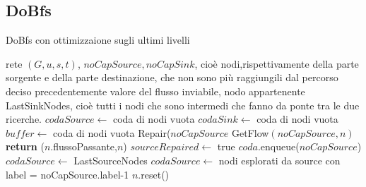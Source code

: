 \documentclass{article}
\begin{document}
\subsection{DoBfs}
\begin{algorithm}
    \caption{DoBfs con ottimizzaione sugli ultimi livelli}
    \begin{algorithmic}[1]
        \REQUIRE rete $(G,u,s,t)$, $noCapSource, noCapSink$, cioè nodi,rispettivamente della parte sorgente e della parte destinazione, che non sono più raggiungili dal percorso deciso precedentemente
        \ENSURE valore del flusso inviabile, nodo appartenente LastSinkNodes, cioè tutti i nodi che sono intermedi che fanno da ponte tra le due ricerche.
        \STATE $codaSource \leftarrow$ coda di nodi vuota
        \STATE $codaSink \leftarrow$ coda di nodi vuota
        \STATE $buffer \leftarrow$ coda di nodi vuota
        \STATE Repair($noCapSource$
        \STATE GetFlow$(noCapSource,n)$ 
        \STATE \textbf{return} ($n$.flussoPassante,$n$)
        \ENDIF
        \ENDFOR
        \ELSE
        \STATE $sourceRepaired \leftarrow$ true
        \ENDIF
        \ENDIF
        \STATE $coda.$enqueue($noCapSource$)
        \STATE $codaSource \leftarrow$ LastSourceNodes 
        \ELSE
        \STATE $codaSource \leftarrow$ nodi esplorati da source con label = noCapSource.label-1
        \STATE $n.$reset()
        \ENDFOR
        \ENDIF
        \ENDIF

    \end{algorithmic}
\end{algorithm}

\newpage
\end{document}
